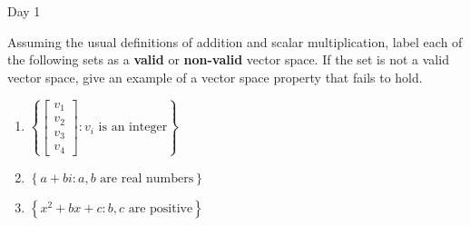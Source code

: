 \begin{applicationActivities}{Day 1}
\begin{activity}{15}
  Assuming the usual definitions of addition and scalar multiplication,
  label each of the following sets as a \textbf{valid} or \textbf{non-valid}
  vector space. If the set is not a valid vector space, give an example of
  a vector space property that fails to hold.
  \begin{multicols}{2}
  \begin{enumerate}
    \item \(\left\{
    \begin{bmatrix}
      v_1\\v_2\\v_3\\v_4
    \end{bmatrix}:v_i\text{ is an integer}\right\}\)
    \item \(\left\{
      a+bi
      :a,b\text{ are real numbers}\right\}\)
    \item \(\left\{
      x^2+bx+c
      :b,c\text{ are positive}\right\}\)
  \end{enumerate}
  \end{multicols}
\end{activity}



\end{applicationActivities}
